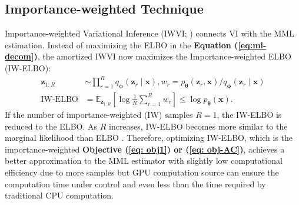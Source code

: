 \documentclass[a4paper,12pt]{article}
\theoremstyle{plain} %
\theoremstyle{remark} %
\theoremstyle{definition} %
\begin{document}
\subsection{Importance-weighted Technique}
Importance-weighted Variational Inference (IWVI; \citealp{burda2015importance}) connects VI with the MML estimation. Instead of maximizing the ELBO in the \textbf{Equation (\ref{eq:ml-decom})}, the amortized IWVI now maximizes the Importance-weighted ELBO (IW-ELBO):
\begin{align}
    \bm{z}_{1:R} &\sim \prod\limits_{r=1}^R q_{\bm{\phi}}(\bm{z}_r \mid \bm{x}), w_r = p_{\bm{\theta}}(\bm{z}_r,\bm{x}) / q_{\bm{\phi}}(\bm{z}_r \mid \bm{x})\nonumber\\
    \text{IW-ELBO} &= \mathbb{E}_{\bm{z}_{1:R}}\left[\log \frac{1}{R}\sum\limits_{r=1}^R w_r\right] \leq \log p_{\bm{\theta}}(\bm{x}).\label{eq:iw-elbo}
\end{align}
If the number of importance-weighted (IW) samples $R=1$, the IW-ELBO is reduced to the ELBO. As $R$ increases, IW-ELBO becomes more similar to the marginal likelihood than ELBO \citep{burda2015importance}. Therefore, optimizing IW-ELBO, which is the importance-weighted \textbf{Objective (\ref{eq: obj1}) or (\ref{eq: obj-AC})}, achieves a better approximation to the MML estimator with slightly low computational efficiency due to more samples but GPU computation source can ensure the computation time under control and even less than the time required by traditional CPU computation.
\end{document}
